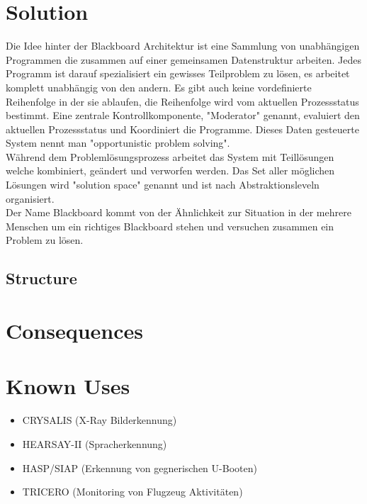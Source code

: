 \section{Solution}
Die Idee hinter der Blackboard Architektur ist eine Sammlung von unabhängigen Programmen die zusammen auf einer gemeinsamen Datenstruktur arbeiten. Jedes Programm ist darauf spezialisiert ein gewisses Teilproblem zu lösen, es arbeitet komplett unabhängig von den andern. Es gibt auch keine vordefinierte Reihenfolge in der sie ablaufen, die Reihenfolge wird vom aktuellen Prozessstatus bestimmt. Eine zentrale Kontrollkomponente, "Moderator" genannt, evaluiert den aktuellen Prozessstatus und Koordiniert die Programme. Dieses Daten gesteuerte System nennt man "opportunistic problem solving".\\
Während dem Problemlösungsprozess arbeitet das System mit Teillösungen welche kombiniert, geändert und verworfen werden. Das Set aller möglichen Lösungen wird "solution space" genannt und ist nach Abstraktionsleveln organisiert.\\
Der Name Blackboard kommt von der Ähnlichkeit zur Situation in der mehrere Menschen um ein richtiges Blackboard stehen und versuchen zusammen ein Problem zu lösen.

\subsection{Structure}

\section{Consequences}
\begin{itemize}
\end{itemize}

\section{Known Uses}
\begin{itemize}
	\item CRYSALIS (X-Ray Bilderkennung)
	\item HEARSAY-II (Spracherkennung)
	\item HASP/SIAP (Erkennung von gegnerischen U-Booten)
	\item TRICERO (Monitoring von Flugzeug Aktivitäten) 
\end{itemize}

